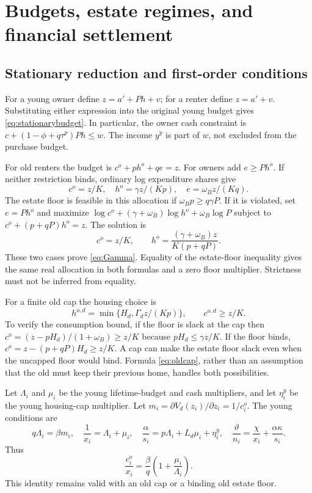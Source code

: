 \documentclass[11pt]{article}
\newcommand{\tht}{\vartheta}
\begin{document}
\label{endmain}
\clearpage
\appendix
\section{Budgets, estate regimes, and financial settlement}\label{app:budgets}
\subsection{Stationary reduction and first-order conditions}
For a young owner define $z=a'+Ph+v$; for a renter define $z=a'+v$. Substituting either expression into the original young budget gives \eqref{eq:stationarybudget}. In particular, the owner cash constraint is $c+(1-\phi+q\tau^p)Ph\le w$. The income $y^y$ is part of $w$, not excluded from the purchase budget.

For old renters the budget is $c^o+ph^o+qe=z$. For owners add $e\ge Ph^o$. If neither restriction binds, ordinary log expenditure shares give
\[
 c^o=z/K,\quad h^o=\gamma z/(Kp),\quad e=\omega_Bz/(Kq).
\]
The estate floor is feasible in this allocation if $\omega_Bp\ge q\gamma P$. If it is violated, set $e=Ph^o$ and maximize
$\log c^o+(\gamma+\omega_B)\log h^o+\omega_B\log P$
subject to $c^o+(p+qP)h^o=z$. The solution is
\[
 c^o=z/K,\qquad h^o=\frac{(\gamma+\omega_B)z}{K(p+qP)}.
\]
These two cases prove \eqref{eq:Gamma}. Equality of the estate-floor inequality gives the same real allocation in both formulas and a zero floor multiplier. Strictness must not be inferred from equality.

For a finite old cap the housing choice is
\begin{equation}
 h^{o,d}=\min\{H_d,\Gamma_dz/(Kp)\},\qquad c^{o,d}\ge z/K.\label{eq:oldcap}
\end{equation}
To verify the consumption bound, if the floor is slack at the cap then
$c^o=(z-pH_d)/(1+\omega_B)\ge z/K$ because $pH_d\le\gamma z/K$. If the floor binds, $c^o=z-(p+qP)H_d\ge z/K$. A cap can make the estate floor slack even when the uncapped floor would bind. Formula \eqref{eq:oldcap}, rather than an assumption that the old must keep their previous home, handles both possibilities.

Let $\Lambda_i$ and $\mu_i$ be the young lifetime-budget and cash multipliers, and let $\eta_i^y$ be the young housing-cap multiplier. Let $m_i=\partial V_d(z_i)/\partial z_i=1/c_i^o$. The young conditions are
\begin{equation}
 q\Lambda_i=\beta m_i,\quad
 \frac1{x_i}=\Lambda_i+\mu_i,\quad
 \frac\alpha{s_i}=p\Lambda_i+L_d\mu_i+\eta_i^y,\quad
 \frac\tht{n_i}=\frac\chi{x_i}+\frac{\alpha\kappa}{s_i}.\label{eq:youngFOC}
\end{equation}
Thus
\begin{equation}
 \frac{c_i^o}{x_i}=\frac\beta q\left(1+\frac{\mu_i}{\Lambda_i}\right).\label{eq:Euler}
\end{equation}
This identity remains valid with an old cap or a binding old estate floor.
\end{document}

